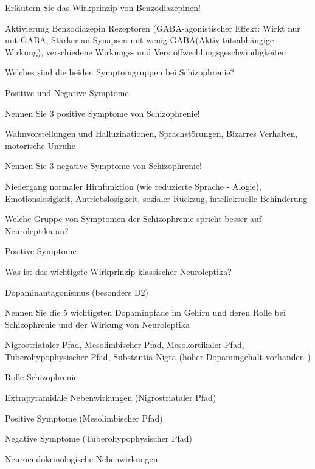 \documentclass[10pt, a4paper]{exam}
\newcommand\Warning{%
 \makebox[1.4em][c]{%
 \makebox[0pt][c]{\raisebox{.1em}{\small!}}%
 \makebox[0pt][c]{\color{red}\Large$\bigtriangleup$}}}%
\begin{document}
\begin{questions}
  \question Erläutern Sie das Wirkprinzip von Benzodiazepinen!
  \begin{solution}
    Aktivierung Benzodiazepin Rezeptoren (GABA-agonistischer Effekt: Wirkt nur mit GABA,
    Stärker an Synapsen mit wenig GABA(Aktivitätsabhängige Wirkung), verschiedene Wirkungs- und Verstoffwechlungsgeschwindigkeiten
  \end{solution}

  \question Welches sind die beiden Symptomgruppen bei Schizophrenie?
  \begin{solution}
    Positive und Negative Symptome
  \end{solution}

  \question Nennen Sie 3 positive Symptome von Schizophrenie!
  \begin{solution}
    Wahnvorstellungen und Halluzinationen, Sprachstörungen, Bizarres Verhalten, motorische Unruhe
  \end{solution}

  \question Nennen Sie 3 negative Symptome von Schizophrenie!
  \begin{solution}
    Niedergang normaler Hirnfunktion (wie reduzierte Sprache - Alogie), Emotionslosigkeit, Antriebslosigkeit, sozialer Rückzug, intellektuelle Behinderung
  \end{solution}

  \question Welche Gruppe von Symptomen der Schizophrenie spricht besser auf Neuroleptika an?
  \begin{solution}
    Positive Symptome
  \end{solution}

  \question Was ist das wichtigste Wirkprinzip klassischer Neuroleptika?
  \begin{solution}
    Dopaminantagonismus (besonders D2)
  \end{solution}

  \question Nennen Sie die 5 wichtigsten Dopaminpfade im Gehirn und deren Rolle bei Schizophrenie und der Wirkung von Neuroleptika
  \begin{solution}
    Nigrostriataler Pfad,
    Mesolimbischer Pfad,
    Mesokortikaler Pfad,
    Tuberohypophysischer Pfad,
    \Warning Substantia Nigra (hoher Dopamingehalt vorhanden )

    Rolle Schizophrenie
    \begin{itemize*}
      \item Extrapyramidale Nebenwirkungen (Nigrostriataler Pfad)
      \item Positive Symptome (Mesolimbischer Pfad)
      \item Negative Symptome (Tuberohypophysischer Pfad)
      \item Neuroendokrinologische Nebenwirkungen
    \end{itemize*}


\end{solution}
\end{questions}
\end{document}
